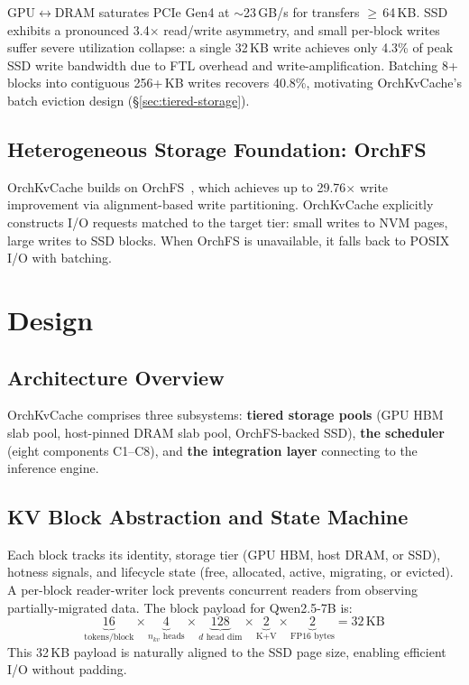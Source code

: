 \documentclass[conference]{IEEEtran}
\begin{document}
GPU$\leftrightarrow$DRAM saturates PCIe Gen4 at ${\sim}$23\,GB/s for transfers $\geq$\,64\,KB. SSD exhibits a pronounced 3.4$\times$ read/write asymmetry, and small per-block writes suffer severe utilization collapse: a single 32\,KB write achieves only 4.3\% of peak SSD write bandwidth due to FTL overhead and write-amplification. Batching 8+ blocks into contiguous 256+\,KB writes recovers 40.8\%, motivating OrchKvCache's batch eviction design (\S\ref{sec:tiered-storage}).

\subsection{Heterogeneous Storage Foundation: OrchFS}

OrchKvCache builds on OrchFS~\cite{orchfs}, which achieves up to 29.76$\times$ write improvement via alignment-based write partitioning. OrchKvCache explicitly constructs I/O requests matched to the target tier: small writes to NVM pages, large writes to SSD blocks. When OrchFS is unavailable, it falls back to POSIX I/O with batching.

\section{Design}

\subsection{Architecture Overview}

OrchKvCache comprises three subsystems: \textbf{tiered storage pools} (GPU HBM slab pool, host-pinned DRAM slab pool, OrchFS-backed SSD), \textbf{the scheduler} (eight components C1--C8), and \textbf{the integration layer} connecting to the inference engine.

\subsection{KV Block Abstraction and State Machine}

Each block tracks its identity, storage tier (GPU HBM, host DRAM, or SSD), hotness signals, and lifecycle state (free, allocated, active, migrating, or evicted). A per-block reader-writer lock prevents concurrent readers from observing partially-migrated data. The block payload for Qwen2.5-7B is:
\[
\underbrace{16}_{\text{tokens/block}} \times \underbrace{4}_{n_{kv}\text{ heads}} \times \underbrace{128}_{d\text{ head dim}} \times \underbrace{2}_{\text{K+V}} \times \underbrace{2}_{\text{FP16 bytes}} = 32\,\text{KB}
\]
This 32\,KB payload is naturally aligned to the SSD page size, enabling efficient I/O without padding.
\end{document}
